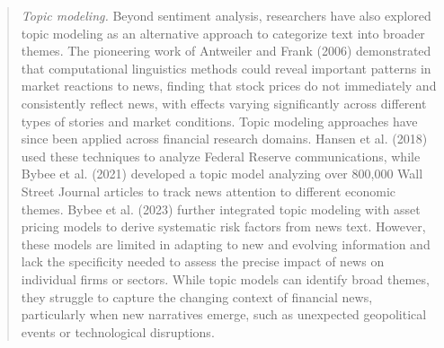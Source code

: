 \begin{quote}
\hspace{0.5cm} \textit{Topic modeling.} 
Beyond sentiment analysis, researchers have also explored topic modeling as an alternative approach to categorize text into broader themes. The pioneering work of 
\cite{antweiler2006us}  Antweiler and Frank (2006) 
demonstrated that computational linguistics methods could reveal important patterns in market reactions to news, finding that stock prices do not immediately and consistently reflect news, with effects varying significantly across different types of stories and market conditions. Topic modeling approaches have since been applied across financial research domains. 
\cite{hansen2018transparency}  Hansen et al. (2018) 
used these techniques to analyze Federal Reserve communications, while 
\cite{bybee2021business}  Bybee et al. (2021) 
developed a topic model analyzing over 800,000 Wall Street Journal articles to track news attention to different economic themes. 
\cite{bybee2023narrative}  Bybee et al. (2023) 
further integrated topic modeling with asset pricing models to derive systematic risk factors from news text.
%
However, these models are limited in adapting to new and evolving information and lack the specificity needed to assess the precise impact of news on individual firms or sectors. While topic models can identify broad themes, they struggle to capture the changing context of financial news, particularly when new narratives emerge, such as unexpected geopolitical events or technological disruptions.


\end{quote}
